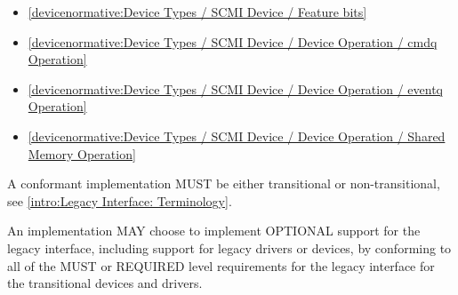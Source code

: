 \begin{itemize}
\item \ref{devicenormative:Device Types / SCMI Device / Feature bits}
\item \ref{devicenormative:Device Types / SCMI Device / Device Operation / cmdq Operation}
\item \ref{devicenormative:Device Types / SCMI Device / Device Operation / eventq Operation}
\item \ref{devicenormative:Device Types / SCMI Device / Device Operation / Shared Memory Operation}
\end{itemize}

\label{sec:Conformance / Legacy Interface: Transitional Device and Transitional Driver Conformance}
A conformant implementation MUST be either transitional or
non-transitional, see \ref{intro:Legacy
Interface: Terminology}.

An implementation MAY choose to implement OPTIONAL support for the
legacy interface, including support for legacy drivers
or devices, by conforming to all of the MUST or
REQUIRED level requirements for the legacy interface
for the transitional devices and drivers.

